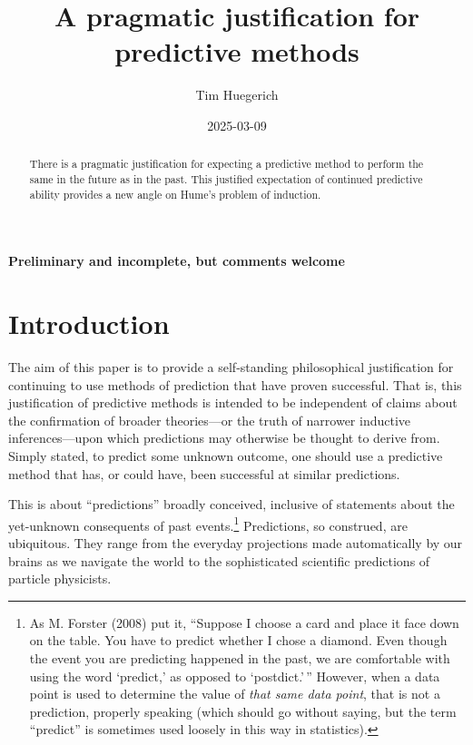 \documentclass[
  letterpaper,
  DIV=11,
  numbers=noendperiod]{scrartcl}
\title{A pragmatic justification for predictive methods}
\author{Tim Huegerich}
\date{2025-03-09}
\theoremstyle{definition}
\theoremstyle{remark}
\begin{document}
\maketitle
\begin{abstract}
There is a pragmatic justification for expecting a predictive method to
perform the same in the future as in the past. This justified
expectation of continued predictive ability provides a new angle on
Hume's problem of induction.
\end{abstract}


\textbf{Preliminary and incomplete, but comments welcome}

\section{Introduction}\label{introduction}

The aim of this paper is to provide a self-standing philosophical
justification for continuing to use methods of prediction that have
proven successful. That is, this justification of predictive methods is
intended to be independent of claims about the confirmation of broader
theories---or the truth of narrower inductive inferences---upon which
predictions may otherwise be thought to derive from. Simply stated, to
predict some unknown outcome, one should use a predictive method that
has, or could have, been successful at similar predictions.

This is about ``predictions'' broadly conceived, inclusive of statements
about the yet-unknown consequents of past events.\footnote{As M. Forster
  (2008) put it, ``Suppose I choose a card and place it face down on the
  table. You have to predict whether I chose a diamond. Even though the
  event you are predicting happened in the past, we are comfortable with
  using the word `predict,' as opposed to `postdict.'\,'' However, when
  a data point is used to determine the value of \emph{that same data
  point}, that is not a prediction, properly speaking (which should go
  without saying, but the term ``predict'' is sometimes used loosely in
  this way in statistics).} Predictions, so construed, are ubiquitous.
They range from the everyday projections made automatically by our
brains as we navigate the world to the sophisticated scientific
predictions of particle physicists.
\end{document}
